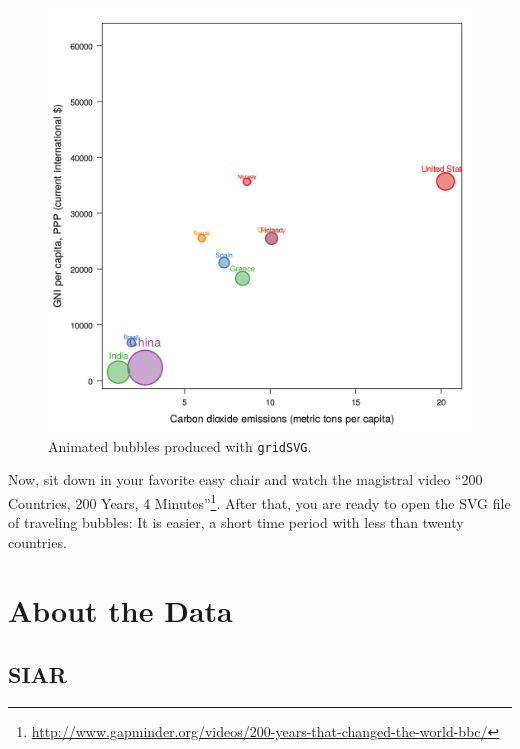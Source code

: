 \documentclass[smallroyalvopaper]{memoir}
\begin{document}
\begin{figure}
  \centering
  \includegraphics[width=\textwidth]{figs/bubbles.png}
  \caption{Animated bubbles produced with \texttt{gridSVG}.}
  \label{fig:bubblesSVG}
\end{figure}

Now, sit down in your favorite easy chair and watch the magistral
video ``200 Countries, 200 Years, 4 Minutes''\footnote{\url{http://www.gapminder.org/videos/200-years-that-changed-the-world-bbc/}}. After that, you are
ready to open the SVG file of traveling bubbles: It is easier, a short
time period with less than twenty countries.

\chapter{About the Data}
\label{sec:org0f45688}
\label{cha:dataTime}

\section{SIAR}
\label{sec:orgea06a9c}
\end{document}
